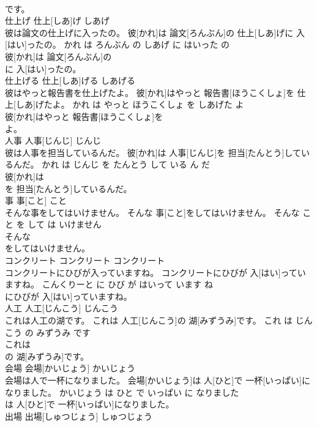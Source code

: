 \documentclass[8pt]{extreport}
\begin{document}
\begin{CJK}{UTF8}{min}
\\	です。			
\\	仕上げ	仕上[しあ]げ	しあげ	
\\	彼は論文の仕上げに入ったの。	彼[かれ]は 論文[ろんぶん]の 仕上[しあ]げに 入[はい]ったの。	かれ は ろんぶん の しあげ に はいった の	
\\	彼[かれ]は 論文[ろんぶん]の
\\	に 入[はい]ったの。			
\\	仕上げる	仕上[しあ]げる	しあげる	
\\	彼はやっと報告書を仕上げたよ。	彼[かれ]はやっと 報告書[ほうこくしょ]を 仕上[しあ]げたよ。	かれ は やっと ほうこくしょ を しあげた よ	
\\	彼[かれ]はやっと 報告書[ほうこくしょ]を
\\	よ。			
\\	人事	人事[じんじ]	じんじ	
\\	彼は人事を担当しているんだ。	彼[かれ]は 人事[じんじ]を 担当[たんとう]しているんだ。	かれ は じんじ を たんとう して いる ん だ	
\\	彼[かれ]は
\\	を 担当[たんとう]しているんだ。			
\\	事	事[こと]	こと	
\\	そんな事をしてはいけません。	そんな 事[こと]をしてはいけません。	そんな こと を して は いけません	
\\	そんな
\\	をしてはいけません。			
\\	コンクリート	コンクリート	コンクリート	
\\	コンクリートにひびが入っていますね。	コンクリートにひびが 入[はい]っていますね。	こんくりーと に ひび が はいって います ね	
\\	にひびが 入[はい]っていますね。			
\\	人工	人工[じんこう]	じんこう	
\\	これは人工の湖です。	これは 人工[じんこう]の 湖[みずうみ]です。	これ は じんこう の みずうみ です	
\\	これは
\\	の 湖[みずうみ]です。			
\\	会場	会場[かいじょう]	かいじょう	
\\	会場は人で一杯になりました。	会場[かいじょう]は 人[ひと]で 一杯[いっぱい]になりました。	かいじょう は ひと で いっぱい に なりました	
\\	は 人[ひと]で 一杯[いっぱい]になりました。			
\\	出場	出場[しゅつじょう]	しゅつじょう	

\end{CJK}
\end{document}
